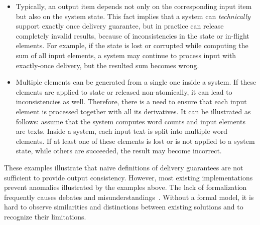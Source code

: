 
\begin{itemize}
    \item Typically, an output item depends not only on the corresponding input item but also on the system state. This fact implies that a system can {\em technically} support exactly once delivery guarantee, but in practice can release completely invalid results, because of inconsistencies in the state or in-flight elements. For example, if the state is lost or corrupted while computing the sum of all input elements, a system may continue to process input with exactly-once delivery, but the resulted sum becomes wrong. 
    \item Multiple elements can be generated from a single one inside a system. If these elements are applied to state or released non-atomically, it can lead to inconsistencies as well. Therefore, there is a need to ensure that each input element is processed together with all its derivatives. It can be illustrated as follows: assume that the system computes word counts and input elements are texts. Inside a system, each input text is split into multiple word elements. If at least one of these elements is lost or is not applied to a system state, while others are succeeded, the result may become incorrect. 
\end{itemize}

These examples illustrate that naive definitions of delivery guarantees are not sufficient to provide output consistency. However, most existing implementations prevent anomalies illustrated by the examples above. The lack of formalization frequently causes debates and misunderstandings~\cite{JerryPengStreamIO, PaperTrail}. Without a formal model, it is hard to observe similarities and distinctions between existing solutions and to recognize their limitations.


